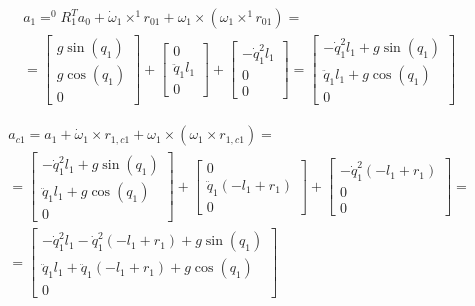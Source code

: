\documentclass[a4paper,14pt]{extreport}
\begin{document}
\begin{itemize}
\begin{align*}
&a_1 = ^0R_1^T a_0 + \dot \omega_1 \times ^1r_{01} + \omega_1 \times (\omega_1 \times ^1r_{01})
=\\
&=
\left[\begin{matrix}g \sin{\left (q_{1} \right )}\\g \cos{\left (q_{1} \right )}\\0\end{matrix}\right]
+
\left[\begin{matrix}0\\\ddot{q}_1 l_{1}\\0\end{matrix}\right]
+
\left[\begin{matrix}- \dot{q}_1^{2} l_{1}\\0\\0\end{matrix}\right]
=
\left[\begin{matrix}- \dot{q}_1^{2} l_{1} + g \sin{\left (q_{1} \right )}\\\ddot{q}_1 l_{1} + g \cos{\left (q_{1} \right )}\\0\end{matrix}\right]
\end{align*}

\begin{align*}
&a_{c1} = a_1 + \dot \omega_1 \times r_{1,c1} + \omega_1 \times (\omega_1 \times r_{1,c1})
=\\
&=
\left[\begin{matrix}- \dot{q}_1^{2} l_{1} + g \sin{\left (q_{1} \right )}\\\ddot{q}_1 l_{1} + g \cos{\left (q_{1} \right )}\\0\end{matrix}\right]
+
\left[\begin{matrix}0\\\ddot{q}_1 \left(- l_{1} + r_{1}\right)\\0\end{matrix}\right]
+
\left[\begin{matrix}- \dot{q}_1^{2} \left(- l_{1} + r_{1}\right)\\0\\0\end{matrix}\right]
=\\
&=
\left[\begin{matrix}- \dot{q}_1^{2} l_{1} - \dot{q}_1^{2} \left(- l_{1} + r_{1}\right) + g \sin{\left (q_{1} \right )}\\\ddot{q}_1 l_{1} + \ddot{q}_1 \left(- l_{1} + r_{1}\right) + g \cos{\left (q_{1} \right )}\\0\end{matrix}\right]
\end{align*}


\end{itemize}
\end{document}
